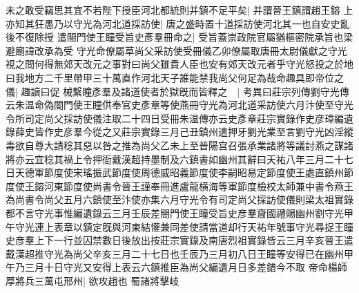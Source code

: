 未之敢受竊思其宜不若陛下授臣河北都統則并鎮不足平矣|{
	并謂晉王鎮謂趙王鎔}
上亦知其狂愚乃以守光為河北道採訪使|{
	唐之盛時置十道採訪使河北其一也自安史亂後不復除授}
遣閤門使王瞳受旨史彥羣冊命之|{
	受旨蓋崇政院官屬猶樞密院承旨也梁避廟諱改承為受}
守光命僚屬草尚父采訪使受冊儀乙卯僚屬取唐冊太尉儀獻之守光視之問何得無郊天改元之事對曰尚父雖貴人臣也安有郊天改元者乎守光怒投之於地曰我地方二千里帶甲三十萬直作河北天子誰能禁我尚父何足為哉命趣具即帝位之儀|{
	趣讀曰促}
械繫瞳彥羣及諸道使者於獄旣而皆釋之　|{
	考異曰莊宗列傳劉守光傳云朱温命偽閤門使王瞳供奉官史彥章等使燕冊守光為河北道采訪使六月汴使至守光令所司定尚父採訪使儀注取二十四日受冊朱温傳亦云史彥章莊宗實錄作史彦璋編遺錄薛史皆作史彦羣今從之又莊宗實錄三月己丑鎮州遣押牙劉光業至言劉守光凶淫縱毒欲自尊大請稔其惡以咎之推為尚父乙未上至晉陽宫召張承業諸將等議討燕之謀諸將亦云宜稔其禍上令押衙戴漢超持墨制及六鎮書如幽州其辭曰天祐八年三月二十七日天德軍節度使宋瑤振武節度使周德威昭義節度使李嗣昭易定節度使王處直鎮州節度使王鎔河東節度使尚書令晉王謹奉冊進盧龍横海等軍節度檢校太師兼中書令燕王為尚書令尚父五月六鎮使至汴使亦集六月守光令有司定尚父採訪使儀則梁太祖實錄都不言守光事惟編遺錄云三月壬辰差閤門使王瞳受旨史彦羣齎國禮賜幽州劉守光甲午守光連上表章以鎮定旣與河東結懽兼同差使請當道却行天祐年號事守光尋捉王瞳史彦羣上下一行並囚禁數日後放出按莊宗實錄及南唐烈祖實錄皆云三月辛亥晉王遣戴漢超推守光為尚父辛亥三月二十七日也壬辰乃三月初八日王瞳等安得已在幽州甲午乃三月十日守光又安得上表云六鎮推臣為尚父編遺月日多差錯今不取}
帝命楊師厚將兵三萬屯邢州|{
	欲攻趙也}
蜀諸將擊岐

